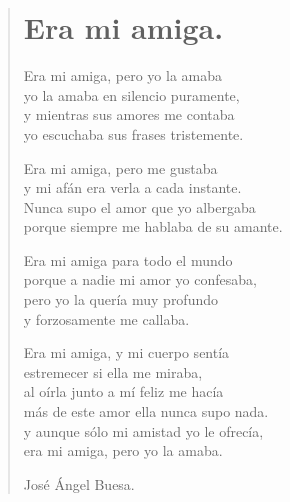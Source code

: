 \documentclass[11pt, portrait, twoside, notitlepage, openright]{book}
\begin{document}
\newpage
\begin{verse}
\begin{center}
\section{Era mi amiga.}
\end{center}
Era mi amiga, pero yo la amaba\\
yo la amaba en silencio puramente,\\
y mientras sus amores me contaba\\
yo escuchaba sus frases tristemente.
\newline

Era mi amiga, pero me gustaba\\
y mi afán era verla a cada instante.\\
Nunca supo el amor que yo albergaba\\
porque siempre me hablaba de su amante.
\newline

Era mi amiga para todo el mundo\\
porque a nadie mi amor yo confesaba,\\
pero yo la quería muy profundo\\
y forzosamente me callaba.
\newline

Era mi amiga, y mi cuerpo sentía\\
estremecer si ella me miraba,\\
al oírla junto a mí feliz me hacía\\
más de este amor ella nunca supo nada.\\
y aunque sólo mi amistad yo le ofrecía,\\
era mi amiga, pero yo la amaba.
\newline

José Ángel Buesa.
\end{verse}
\end{document}
